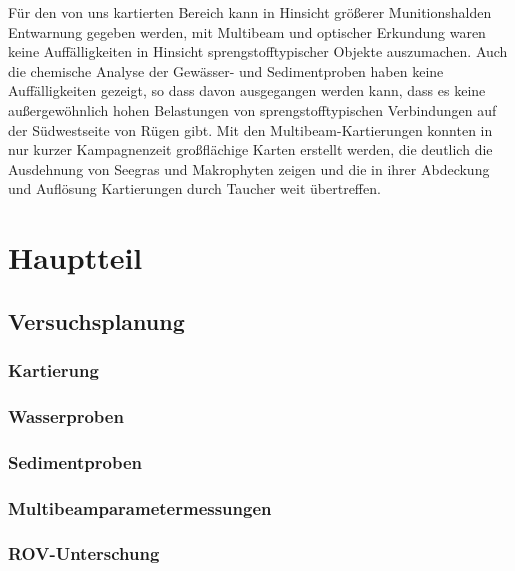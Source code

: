 \documentclass[12pt,titlepage]{scrreprt}
\begin{document}
Für den von uns kartierten Bereich kann in Hinsicht größerer Munitionshalden Entwarnung gegeben werden, mit Multibeam und optischer Erkundung waren keine Auffälligkeiten in Hinsicht sprengstofftypischer Objekte auszumachen. Auch die chemische Analyse der Gewässer- und Sedimentproben haben keine Auffälligkeiten gezeigt, so dass davon ausgegangen werden kann, dass es keine außergewöhnlich hohen Belastungen von sprengstofftypischen Verbindungen auf der Südwestseite von Rügen gibt. Mit den Multibeam-Kartierungen konnten in nur kurzer Kampagnenzeit  großflächige Karten erstellt werden, die deutlich die Ausdehnung von Seegras und Makrophyten zeigen und die in ihrer Abdeckung und Auflösung Kartierungen durch Taucher weit übertreffen.

\tableofcontents

\chapter{Hauptteil}
\section{Versuchsplanung}
\subsection{Kartierung}

\subsection{Wasserproben}

\subsection{Sedimentproben}

\subsection{Multibeamparametermessungen}

\subsection{ROV-Unterschung}








\end{document}
